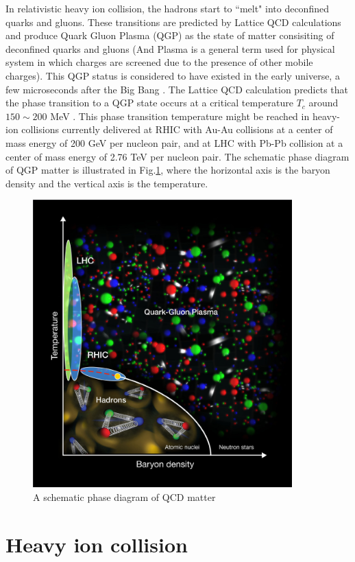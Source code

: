 In relativistic heavy ion collision, the hadrons start to ``melt" into deconfined quarks and gluons. These transitions are predicted by Lattice QCD calculations \cite{Adams:2005dq} and produce Quark Gluon Plasma (QGP) as the state of matter consisiting of deconfined quarks and gluons (And Plasma is a general term used for physical system in which charges are screened due to the presence of other mobile charges). This QGP status is considered to have existed in the early universe, a few microseconds after the Big Bang \cite{PhysRevLett.34.1353, CABIBBO197567}. The Lattice QCD calculation predicts that the phase transition to a QGP state occurs at a critical temperature $T_c$ around $150\sim200$ MeV \cite{karsch}. This phase transition temperature might be reached in heavy-ion collisions currently delivered at RHIC with Au-Au collisions at a center of mass energy of 200 GeV per nucleon pair, and at LHC with Pb-Pb collision at a center of mass energy of 2.76 TeV per nucleon pair. The schematic phase diagram of QGP matter is illustrated in Fig.\ref{fig1}, where the horizontal axis is the baryon density and the vertical axis is the temperature. 
	
	
\begin{figure}[ht]
\centerline{\includegraphics[width=10.0cm]{figures/RHIC_Graphics_Fig1-HR}}
\caption{A schematic phase diagram of QCD matter \cite{fig_phase_dia}}
\label{fig1}
\end{figure}



\section{Heavy ion collision}

